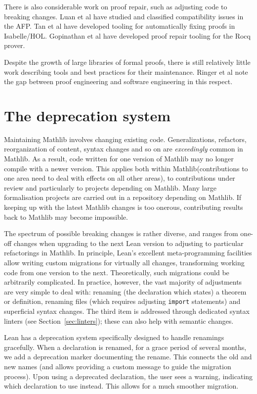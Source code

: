 \documentclass[runningheads]{llncs}
\def\mathlib{Mathlib\xspace}
\newcommand{\lean}[1]{\texttt{#1}}
\begin{document}
There is also considerable work on proof repair, such as adjusting code to breaking changes.
Luan et al \cite{LuanCompatAFP} have studied and classified compatibility issues in the AFP.
Tan et al \cite{BurdenOfProof} have developed tooling for automatically fixing proofs in Isabelle/HOL.
Gopinathan et al \cite{GopinathanProofRepair} have developed proof repair tooling for the Rocq prover.

Despite the growth of large libraries of formal proofs, there is still relatively little work describing tools and best practices for their maintenance.
Ringer et al \cite{Ringer19} note the gap between proof engineering and software engineering in this respect.

\section{The deprecation system}
\label{sec:deprecations}

Maintaining \mathlib involves changing existing code. Generalizations, refactors, reorganization of content, syntax changes and so on are \emph{exceedingly} common in \mathlib.
As a result, code written for one version of \mathlib may no longer compile with a newer version.
This applies both within \mathlib (contributions to one area need to deal with effects on all other areas), to contributions under review and particularly to projects depending on \mathlib. Many large formalisation projects are carried out in a repository depending on \mathlib. If keeping up with the latest \mathlib changes is too onerous, contributing results back to \mathlib may become impossible.

The spectrum of possible breaking changes is rather diverse, and ranges from one-off changes when upgrading to the next Lean version to adjusting to particular refactorings in \mathlib.
In principle, Lean's excellent meta-programming facilities allow writing custom migrations for virtually all changes, transforming working code from one version to the next.
Theoretically, such migrations could be arbitrarily complicated.
In practice, however, the vast majority of adjustments are very simple to deal with: renaming (the declaration which states) a theorem or definition, renaming files (which requires adjusting \lean{import} statements) and superficial syntax changes. The third item is addressed through dedicated syntax linters (see Section~\ref{sec:linters}); these can also help with semantic changes.

Lean has a deprecation system specifically designed to handle renamings gracefully.
When a declaration is renamed, for a grace period of several months, we add a deprecation marker documenting the rename. This connects the old and new names (and allows providing a custom message to guide the migration process). Upon using a deprecated declaration, the user sees a warning, indicating which declaration to use instead.
This allows for a much smoother migration. %
\end{document}
